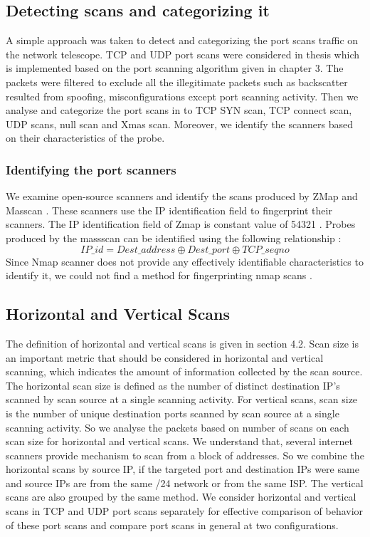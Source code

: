 \subsection{Detecting scans and categorizing it}
A simple approach was taken to detect and categorizing the port scans traffic on the network telescope.
TCP and UDP port scans were considered in thesis which is implemented based on the port scanning algorithm given in chapter 3.
The packets were filtered to exclude all the illegitimate packets such as backscatter resulted from spoofing, misconfigurations except port scanning activity. 
Then we analyse and categorize the port scans in to TCP SYN scan, TCP connect
scan, UDP scans, null scan and Xmas scan. Moreover, we identify the scanners based on their characteristics of the probe.
\subsubsection{Identifying the port scanners}
We examine open-source scanners and identify the scans produced by ZMap \cite{durumeric2013zmap} and Masscan \cite{graham2014masscan}. 
These scanners use the IP identification field to fingerprint their scanners.
The IP identification field of Zmap is constant value of 54321 \cite{durumeric2014internet}.
Probes produced by the massscan can be identified using the following relationship \cite{durumeric2014internet}:
\[IP\_id = Dest\_address \oplus Dest\_port \oplus TCP\_seqno \]
Since Nmap scanner does not provide any effectively identifiable characteristics to identify it, we could not find a method for fingerprinting nmap scans \cite{lyon2009nmap}.
\subsection{Horizontal and Vertical Scans}
The definition of horizontal and vertical scans is given in section 4.2.
Scan size is an important metric that should be considered in horizontal and vertical scanning, which indicates the amount of information collected by the scan source.
The horizontal scan size is defined as the number of distinct destination IP's scanned by scan source at a single scanning activity.
For vertical scans, scan size is the number of unique destination ports scanned by scan source at a single scanning activity.
So we analyse the packets based on number of scans on each scan size for horizontal and vertical scans.
We understand that, several internet scanners provide mechanism to scan from a block of addresses.
So we combine the horizontal scans by source IP, if the targeted port and destination IPs were same and source IPs are from the same /24 network or from the  same ISP.
The vertical scans are also grouped by the same method.
We consider horizontal and vertical scans in TCP and UDP port scans separately for effective comparison of behavior of these port scans and compare port scans in general at two configurations. 
